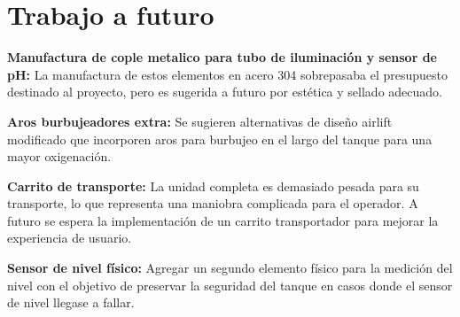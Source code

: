 \section{Trabajo a futuro}

\textbf{Manufactura de cople metalico para tubo de iluminación y sensor de pH:} La manufactura de estos elementos en acero 304 sobrepasaba el presupuesto destinado al proyecto, pero es sugerida a futuro por estética y sellado adecuado. 

\textbf{Aros burbujeadores extra:} Se sugieren alternativas de diseño airlift modificado que incorporen aros para burbujeo en el largo del tanque para una mayor oxigenación. 

\textbf{Carrito de transporte: }La unidad completa es demasiado pesada para su transporte, lo que representa una maniobra complicada para el operador. A futuro se espera la implementación de un carrito transportador para mejorar la experiencia de usuario.

\textbf{Sensor de nivel físico:} Agregar un segundo elemento físico para la medición del nivel con el objetivo de preservar la seguridad del tanque en casos donde el sensor de nivel llegase a fallar. 


